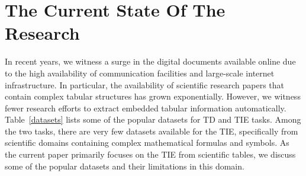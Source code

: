 \documentclass[runningheads]{llncs}
\begin{document}
\section{The Current State Of The Research}
\label{sec:rel_work}
In recent years, we witness a surge in the digital documents available online due to the high availability of communication facilities and large-scale internet infrastructure. In particular, the availability of scientific research papers that contain complex tabular structures has grown exponentially. However, we witness fewer research efforts to extract embedded tabular information automatically. Table~\ref{datasets} lists some of the popular datasets for TD and TIE tasks. Among the two tasks, there are very few datasets available for the TIE, specifically from scientific domains containing complex mathematical formulas and symbols. As the current paper primarily focuses on the TIE from scientific tables, we discuss some of the popular datasets and their limitations in this domain. 
\end{document}
